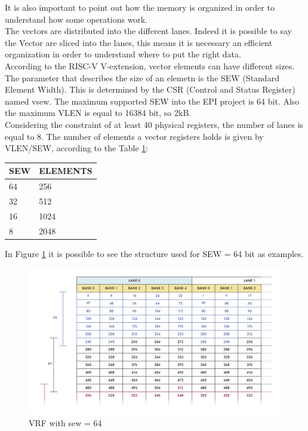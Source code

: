 It is also important to point out how the memory is organized in order to understand how some operations work.\\

The vectors are distributed into the different lanes. Indeed it is possible to say the Vector are sliced into the lanes, this means it is necessary an efficient organization in order to understand where to put the right data.\\


According to the RISC-V V-extension, vector elements can have different sizes. The parameter that describes the size of an elemetn is the SEW (Standard Element Width). This is determined by the CSR (Control and Status Register) named vsew. The maximum supported SEW into the EPI project is 64 bit. Also the maximum VLEN is equal to 16384 bit, so 2kB.\\

Considering the constraint of at least 40 physical registers, the number of lanes is equal to 8.
The number of elements a vector registers holds is given by VLEN/SEW, according to the Table \ref{sew-el}:


\begin{table}[H]
    \centering
    \begin{tabular}{|l|l|}
    \hline
        \rowcolor[HTML]{C0C0C0} 
        SEW & ELEMENTS \\ \hline
        64  & 256      \\ \hline
        32  & 512      \\ \hline
        16  & 1024     \\ \hline
        8   & 2048     \\ \hline
    \end{tabular}
    \label{sew-el}
\end{table}

In Figure \ref{vrf-64} it is possible to see the structure used for SEW = 64 bit as examples.
\begin{figure}[H]
    \centering
    \includegraphics[scale = 0.45]{Chapter_1/img/vrf-64.png}
    \caption{VRF with sew = 64}
    \label{vrf-64}
\end{figure}

